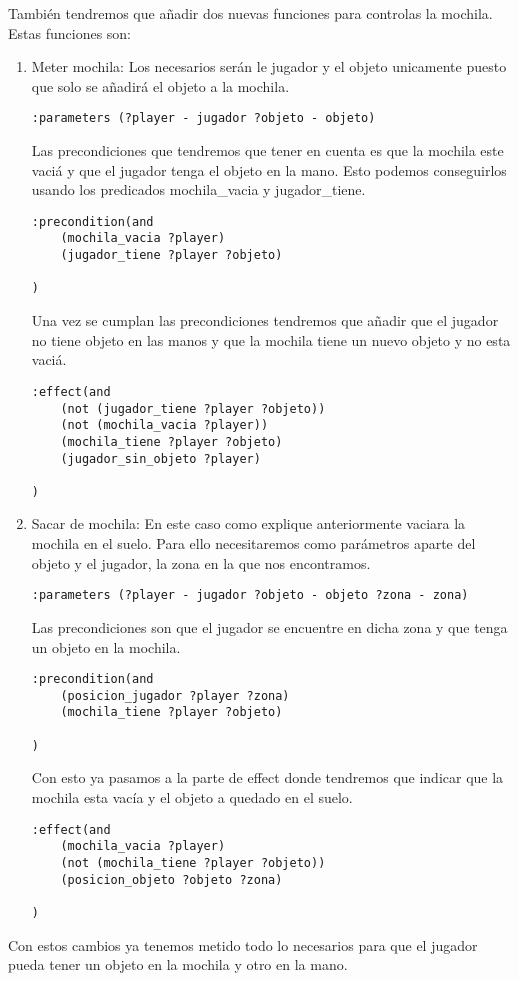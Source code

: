 \documentclass[]{article}
\begin{document}
También tendremos que añadir dos nuevas funciones para controlas la mochila. Estas funciones son: 
\begin{enumerate}
\item{Meter mochila:} Los necesarios serán le jugador y el objeto unicamente puesto que solo se añadirá el objeto a la mochila. 
\begin{lstlisting}
:parameters (?player - jugador ?objeto - objeto)
\end{lstlisting}
Las precondiciones que tendremos que tener en cuenta es que la mochila este vaciá y que el jugador tenga el objeto en la mano. Esto podemos conseguirlos usando los predicados mochila\_vacia y jugador\_tiene. 

\begin{lstlisting}
:precondition(and			
	(mochila_vacia ?player)
	(jugador_tiene ?player ?objeto)

)
\end{lstlisting}

Una vez se cumplan las precondiciones tendremos que añadir que el jugador no tiene objeto en las manos y que la mochila tiene un nuevo objeto y no esta vaciá.
\begin{lstlisting}
:effect(and 
	(not (jugador_tiene ?player ?objeto))
	(not (mochila_vacia ?player))
	(mochila_tiene ?player ?objeto)
	(jugador_sin_objeto ?player)

)

\end{lstlisting}
\item{Sacar de mochila:} En este caso como explique anteriormente vaciara la mochila en el suelo. Para ello necesitaremos como parámetros aparte del objeto y el jugador, la zona en la que nos encontramos.
\begin{lstlisting}
:parameters (?player - jugador ?objeto - objeto ?zona - zona)
\end{lstlisting}
Las precondiciones son que el jugador se encuentre en dicha zona y que tenga un objeto en la mochila.
\begin{lstlisting}
:precondition(and			
	(posicion_jugador ?player ?zona)
	(mochila_tiene ?player ?objeto)

)
\end{lstlisting}
Con esto ya pasamos a la parte de effect donde tendremos que indicar que la mochila esta vacía y el objeto a quedado en el suelo.
\begin{lstlisting}
:effect(and 
	(mochila_vacia ?player)
	(not (mochila_tiene ?player ?objeto))
	(posicion_objeto ?objeto ?zona)

)
\end{lstlisting}
\end{enumerate}
Con estos cambios ya tenemos metido todo lo necesarios para que el jugador pueda tener un objeto en la mochila y otro en la mano.
\end{document}
